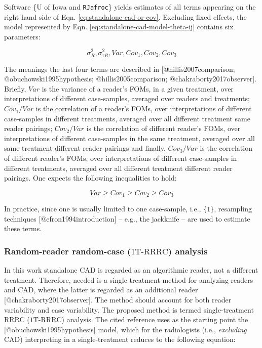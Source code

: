\documentclass[
]{article}
\begin{document}
Software \{U of Iowa and \texttt{RJafroc}\} yields estimates of all terms appearing on the right hand side of Eqn. \eqref{eq:standalone-cad-or-cov}. Excluding fixed effects, the model represented by Eqn. \eqref{eq:standalone-cad-model-theta-ij} contains six parameters:

\begin{equation}
\sigma_R^2, \sigma_{\tau R}^2, Var, Cov_1, Cov_2, Cov_3
\label{eq:standalone-var-comp}
\end{equation}

The meanings the last four terms are described in {[}@hillis2007comparison; @obuchowski1995hypothesis; @hillis2005comparison; @chakraborty2017observer{]}. Briefly, \(Var\) is the variance of a reader's FOMs, in a given treatment, over interpretations of different case-samples, averaged over readers and treatments; \(Cov_1/Var\) is the correlation of a reader's FOMs, over interpretations of different case-samples in different treatments, averaged over all different treatment same reader pairings; \(Cov_2/Var\) is the correlation of different reader's FOMs, over interpretations of different case-samples in the same treatment, averaged over all same treatment different reader pairings and finally, \(Cov_3/Var\) is the correlation of different reader's FOMs, over interpretations of different case-samples in different treatments, averaged over all different treatment different reader pairings. One expects the following inequalities to hold:

\begin{equation}
Var \geq Cov_1 \geq Cov_2 \geq Cov_3
\label{eq:standalone-var-comp-ordering}
\end{equation}

In practice, since one is usually limited to one case-sample, i.e., \(\{1\}\), resampling techniques {[}@efron1994introduction{]} -- e.g., the jackknife -- are used to estimate these terms.

\hypertarget{standalone-cad-radiologists-1TRRRC-anlaysis}{%
\subsubsection{\texorpdfstring{Random-reader random-case (\(\text{1T-RRRC}\)) analysis}{Random-reader random-case (\textbackslash text\{1T-RRRC\}) analysis}}\label{standalone-cad-radiologists-1TRRRC-anlaysis}}

In this work standalone CAD is regarded as an algorithmic reader, not a different treatment.
Therefore, needed is a single treatment method for analyzing readers and CAD, where the latter is regarded as an additional reader {[}@chakraborty2017observer{]}. The method should account for both reader variability and case variability. The proposed method is termed single-treatment RRRC (\(\text{1T-RRRC}\)) analysis. The cited reference uses as the starting point the {[}@obuchowski1995hypothesis{]} model, which for the radiologists (i.e., \emph{excluding} CAD) interpreting in a single-treatment reduces to the following equation:
\end{document}
